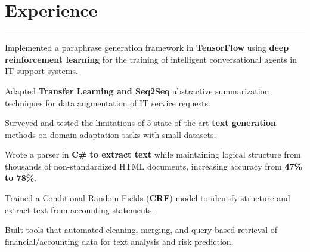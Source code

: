 \documentclass[]{dafirebanks-resume-openfont}
\begin{document}
\begin{minipage}[t]{0.66\textwidth} 

\vspace{-1.2pt}
\section{Experience}
\vspace{-3pt}
{\color{blue}\hrule} \vspace{5pt}

\hspace{71pt}
\vspace{\topsep} %
\begin{tightemize}
	\item Implemented a paraphrase generation framework in \textbf{TensorFlow} using\textbf{ deep reinforcement learning} for the training of intelligent conversational agents in IT support systems.
	\item Adapted \textbf{Transfer Learning and Seq2Seq} abstractive summarization techniques for data augmentation of IT service requests.
	\item Surveyed and tested the limitations of 5 state-of-the-art \textbf{text generation} methods on domain adaptation tasks with small datasets.
\end{tightemize}
\sectionsep

\hspace{153pt} 
{} 
\location{}

\begin{tightemize}
    \item Wrote a parser in \textbf{C\# to extract text} while maintaining logical structure from thousands of non-standardized HTML documents, increasing accuracy from \textbf{47\% to 78\%}.
    \item Trained a Conditional Random Fields (\textbf{CRF}) model to identify structure and extract text from accounting statements.
	\item Built tools that automated cleaning, merging, and query-based retrieval of financial/accounting data for text analysis and risk prediction.
\end{tightemize}
\sectionsep


\end{minipage}
\end{document}
